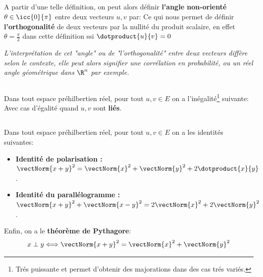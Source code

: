 \subsection*{}
A partir d'une telle définition, on peut alors définir \textbf{l'angle non-orienté} \(\theta \in \icc{0}{\pi}\) entre deux vecteurs \(u, v\) par:
Ce qui nous permet de définir \textbf{l'orthogonalité} de deux vecteurs par la nullité du produit scalaire, en effet \(\theta = \frac{\pi}{2}\) dans cette définition ssi \(\dotproduct{u}{v} = 0\)
\begin{center}
   \textit{L'interprétation de cet "angle" ou de "l'orthogonalité" entre deux vecteurs diffère selon le contexte, elle peut alors signifier une corrélation en probabilité, ou un réel angle géométrique dans \(\R^n\) par exemple.}
\end{center}

\subsection*{}
Dans tout espace préhilbertien réel, pour tout \(u, v \in E\) on a l'inégalité\footnote[1]{Trés puissante et permet d'obtenir des majorations dans des cas trés variés.} suivante:
Avec cas d'égalité quand \(u, v\) sont \textbf{liés}.

\subsection*{}
Dans tout espace préhilbertien réel, pour tout \(u, v \in E\) on a les identités suivantes:
\begin{itemize}
   \item \textbf{Identité de polarisation :} \(\vectNorm{x + y}^2 = \vectNorm{x}^2 + \vectNorm{y}^2 + 2 \dotproduct{x}{y}\).
   \item \textbf{Identité du parallélogramme :} \(\vectNorm{x + y}^2 + \vectNorm{x - y}^2 = 2\vectNorm{x}^2 + 2\vectNorm{y}^2\).
\end{itemize}
Enfin, on a le \textbf{théorème de Pythagore}:
\[
   x \perp y \Longleftrightarrow \vectNorm{x + y}^2 = \vectNorm{x}^2 + \vectNorm{y}^2
\]

